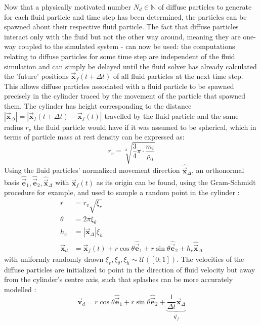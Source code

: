 \documentclass[oneside, a4paper]{book}
\newcommand\abs[1]{\left|#1\right|}
\newcommand\vek[1]{\vec{\bm{#1}}}
\newcommand\nvek[1]{\hat{\vec{\bm{#1}}}}
\newcommand\br[1]{\left(#1\right)}
\begin{document}
  Now that a physically motivated number $N_d\in\mathds{N}$ of diffuse particles to generate for each fluid particle and time step has been determined, the particles can be spawned about their respective fluid particle. The fact that diffuse particles interact only with the fluid but not the other way around, meaning they are one-way coupled to the simulated system - can now be used: the computations relating to diffuse particles for some time step are independent of the fluid simulation and can simply be delayed until the fluid solver has already calculated the 'future' positions $\vek{x}_f\br{t+\Delta t}$ of all fluid particles at the next time step. This allows diffuse particles associated with a fluid particle to be spawned precisely in the cylinder traced by the movement of the particle that spawned them. The cylinder has height corresponding to the distance $\abs{\vek{x}_\Delta} = \abs{\vek{x}_f\br{t+\Delta t}-\vek{x}_f\br{t}}$ travelled by the fluid particle and the same radius $r_v$ the fluid particle would have \autocite{spray-foam-bubbles} if it was assumed to be spherical, which in terms of particle mass at rest density can be expressed as:
  \begin{equation}
    r_v = \sqrt[3]{\frac{3}{4}\pi \cdot \frac{m_i}{\rho_0}}
  \end{equation}
  Using the fluid particles' normalized movement direction $\nvek{x}_\Delta$, an orthonormal basis $\nvek{e}_1, \nvek{e}_2, \nvek{x}_\Delta$ with $\vek{x}_f\br{t}$ as its origin can be found, using the Gram-Schmidt procedure for example, and used to sample a random point in the cylinder \autocite{spray-foam-bubbles}:
  \begin{align}
    r &= r_v\sqrt{\xi_r}\\
    \theta &= 2\pi \xi_\theta\\
    h_{c} &= \abs{\vek{x}_\Delta}\xi_h\\
    \vek{x}_d &= \vek{x}_f\br{t} + r\cos\theta \nvek{e}_1 + r\sin\theta\nvek{e}_2 + h_{c} \nvek{x}_\Delta
  \end{align}
  with uniformly randomly drawn $\xi_r, \xi_\theta, \xi_h \sim \mathcal{U}\br{[0;1]}$. The velocities of the diffuse particles are initialized to point in the direction of fluid velocity but away from the cylinder's centre axis, such that splashes can be more accurately modelled \autocite{spray-foam-bubbles}:
  \begin{equation}
    \vek{v}_d = r\cos\theta \nvek{e}_1 + r\sin\theta\nvek{e}_2 + \underbrace{\frac{1}{\Delta t}\vek{x}_\Delta}_{\vek{v}_f}
  \end{equation}
\end{document}
